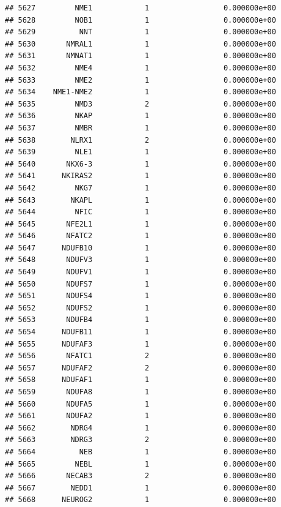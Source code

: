 \documentclass[
]{article}
\begin{document}
\begin{verbatim}
## 5627         NME1            1                 0.000000e+00
## 5628         NOB1            1                 0.000000e+00
## 5629          NNT            1                 0.000000e+00
## 5630       NMRAL1            1                 0.000000e+00
## 5631       NMNAT1            1                 0.000000e+00
## 5632         NME4            1                 0.000000e+00
## 5633         NME2            1                 0.000000e+00
## 5634    NME1-NME2            1                 0.000000e+00
## 5635         NMD3            2                 0.000000e+00
## 5636         NKAP            1                 0.000000e+00
## 5637         NMBR            1                 0.000000e+00
## 5638        NLRX1            2                 0.000000e+00
## 5639         NLE1            1                 0.000000e+00
## 5640       NKX6-3            1                 0.000000e+00
## 5641      NKIRAS2            1                 0.000000e+00
## 5642         NKG7            1                 0.000000e+00
## 5643        NKAPL            1                 0.000000e+00
## 5644         NFIC            1                 0.000000e+00
## 5645       NFE2L1            1                 0.000000e+00
## 5646       NFATC2            1                 0.000000e+00
## 5647      NDUFB10            1                 0.000000e+00
## 5648       NDUFV3            1                 0.000000e+00
## 5649       NDUFV1            1                 0.000000e+00
## 5650       NDUFS7            1                 0.000000e+00
## 5651       NDUFS4            1                 0.000000e+00
## 5652       NDUFS2            1                 0.000000e+00
## 5653       NDUFB4            1                 0.000000e+00
## 5654      NDUFB11            1                 0.000000e+00
## 5655      NDUFAF3            1                 0.000000e+00
## 5656       NFATC1            2                 0.000000e+00
## 5657      NDUFAF2            2                 0.000000e+00
## 5658      NDUFAF1            1                 0.000000e+00
## 5659       NDUFA8            1                 0.000000e+00
## 5660       NDUFA5            1                 0.000000e+00
## 5661       NDUFA2            1                 0.000000e+00
## 5662        NDRG4            1                 0.000000e+00
## 5663        NDRG3            2                 0.000000e+00
## 5664          NEB            1                 0.000000e+00
## 5665         NEBL            1                 0.000000e+00
## 5666       NECAB3            2                 0.000000e+00
## 5667        NEDD1            1                 0.000000e+00
## 5668      NEUROG2            1                 0.000000e+00

\end{verbatim}
\end{document}
